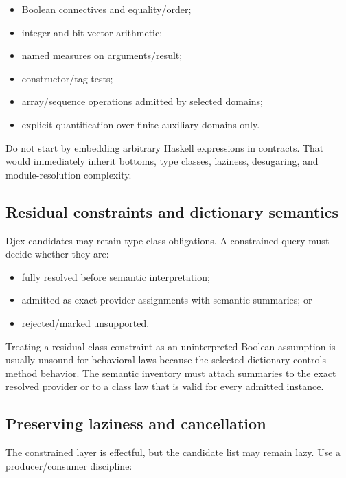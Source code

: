 \documentclass[11pt,oneside]{article}
\begin{document}
\begin{itemize}
  \item Boolean connectives and equality/order;
  \item integer and bit-vector arithmetic;
  \item named measures on arguments/result;
  \item constructor/tag tests;
  \item array/sequence operations admitted by selected domains;
  \item explicit quantification over finite auxiliary domains only.
\end{itemize}

Do not start by embedding arbitrary Haskell expressions in contracts. That would
immediately inherit bottoms, type classes, laziness, desugaring, and module-resolution
complexity.

\subsection{Residual constraints and dictionary semantics}

Djex candidates may retain type-class obligations. A constrained query must decide
whether they are:

\begin{itemize}
  \item fully resolved before semantic interpretation;
  \item admitted as exact provider assignments with semantic summaries; or
  \item rejected/marked unsupported.
\end{itemize}

Treating a residual class constraint as an uninterpreted Boolean assumption is usually
unsound for behavioral laws because the selected dictionary controls method behavior.
The semantic inventory must attach summaries to the exact resolved provider or to a
class law that is valid for every admitted instance.

\subsection{Preserving laziness and cancellation}

The constrained layer is effectful, but the candidate list may remain lazy. Use a
producer/consumer discipline:
\end{document}
